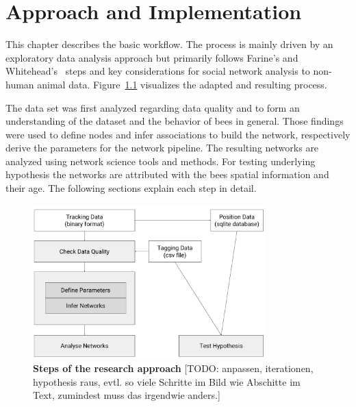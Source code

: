 \chapter{Approach and Implementation}
\label{ch:approach}

This chapter describes the basic workflow. The process is mainly driven by an exploratory data analysis approach but primarily follows  Farine's and Whitehead's~\cite{farine2015constructing} steps and key considerations for social network analysis to non-human animal data. Figure~\ref{fig:process} visualizes the adapted and resulting process.

The data set was first analyzed regarding data quality and to form an understanding of the dataset and the behavior of bees in general. Those findings were used to define nodes and infer associations to build the network, respectively derive the parameters for the network pipeline. The resulting networks are analyzed using network science tools and methods. For testing underlying hypothesis the networks are attributed with the bees spatial information and their age. The following sections explain each step in detail.


\begin{figure}[htb]
	\centering
	\includegraphics[width=0.8\textwidth]{Figures/process}
	\caption[Steps of the research approach]{\textbf{Steps of the research approach} [TODO: anpassen, iterationen, hypothesis raus, evtl. so viele Schritte im Bild wie Abschitte im Text, zumindest muss das irgendwie anders.]}
	\label{fig:process}
\end{figure}


